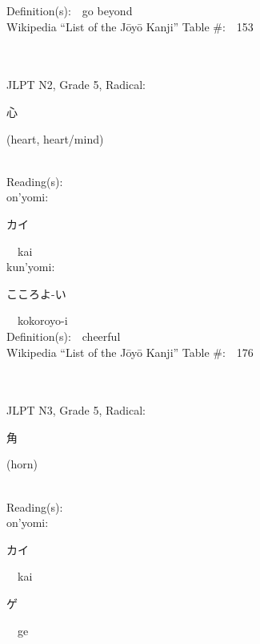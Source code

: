 \begin{multicols}{2}
Definition(s):\ \ go beyond \\
Wikipedia ``List of the J\=oy\=o Kanji'' Table \#:\ \ 153 \\
\ \ \\
{\fontsize{34pt}{40pt}  }\ \ \\  %
{JLPT N2, Grade 5, Radical:\ \ {\begin{CJK}{UTF8}{min} 心 \end{CJK}} (heart, heart/mind) } \\
Reading(s):\ \ \\
{\hspace*{1em}}on'yomi:\ \ \\
{\hspace*{2em}}{\begin{CJK}{UTF8}{min} カイ \end{CJK}}\ \ kai\ \ \\
{\hspace*{1em}}kun'yomi:\ \ \\
{\hspace*{2em}}{\begin{CJK}{UTF8}{min} こころよ-い \end{CJK}}\ \ kokoroyo-i\ \ \\
Definition(s):\ \ cheerful \\
Wikipedia ``List of the J\=oy\=o Kanji'' Table \#:\ \ 176 \\
\ \ \\
{\fontsize{34pt}{40pt}  }\ \ \\  %
{JLPT N3, Grade 5, Radical:\ \ {\begin{CJK}{UTF8}{min} 角 \end{CJK}} (horn) } \\
Reading(s):\ \ \\
{\hspace*{1em}}on'yomi:\ \ \\
{\hspace*{2em}}{\begin{CJK}{UTF8}{min} カイ \end{CJK}}\ \ kai\ \ \\
{\hspace*{2em}}{\begin{CJK}{UTF8}{min} ゲ \end{CJK}}\ \ ge\ \ \\

\end{multicols}
